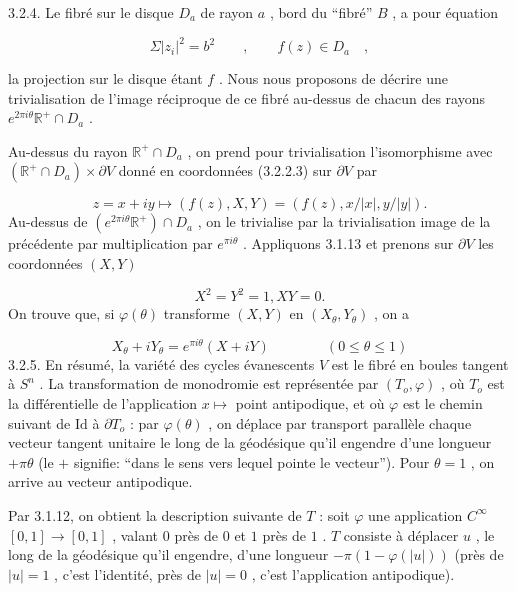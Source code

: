 3.2.4. Le fibré sur le disque $D_a$ de rayon $a$ , bord du ``fibré'' $B$ , a pour équation

\begin{equation*}
\Sigma |z_i|^2 = b^2 \qquad , \qquad f(z) \in D_a \quad , 
\end{equation*}


 la projection sur le disque étant $f$ . Nous nous proposons de décrire une trivialisation de l'image réciproque de ce fibré au-dessus de chacun des rayons $e^{2\pi i \theta} \mathbb{R}^+ \cap D_a$ .

Au-dessus du rayon $\mathbb{R}^+ \cap D_a$ , on prend pour trivialisation l'isomorphisme avec $(\mathbb{R}^+ \cap D_a) \times \partial V$ donné en coordonnées (3.2.2.3) sur $\partial V$ par

\begin{equation*}
z = x+iy \longmapsto (f(z), X, Y) = (f(z), x/|x|, y/|y|) .
\end{equation*}
Au-dessus de $(e^{2\pi i \theta} \mathbb{R}^+) \cap D_a$ , on le trivialise par la trivialisation image de la précédente par multiplication par $e^{\pi i \theta}$ . Appliquons 3.1.13 et prenons sur $\partial V$ les coordonnées $(X, Y)$

\begin{equation}\tag{3.2.4.1}
X^2 = Y^2 = 1, XY = 0 .
\end{equation}
On trouve que, si $\varphi(\theta)$ transforme $(X, Y)$ en $(X_\theta, Y_\theta)$ , on a

\begin{equation}\tag{3.2.4.2}
X_\theta + i Y_\theta = e^{\pi i \theta}(X + i Y) \qquad\qquad (0 \leq \theta \leq 1)
\end{equation}
3.2.5. En résumé, la variété des cycles évanescents $V$ est le fibré en boules tangent à $S^n$ . La transformation de monodromie est représentée par $(T_o, \varphi)$ , où $T_o$ est la différentielle de l'application $x \longmapsto$ point antipodique, et où $\varphi$ est le chemin suivant de $\mathrm{Id}$ à $\partial T_o$ : par $\varphi(\theta)$ , on déplace par transport parallèle chaque vecteur tangent unitaire le long de la géodésique qu'il engendre d'une longueur $+ \pi \theta$ (le $+$ signifie: ``dans le sens vers lequel pointe le vecteur''). Pour $\theta = 1$ , on arrive au vecteur antipodique.

Par 3.1.12, on obtient la description suivante de $T$ : soit $\varphi$ une application $C^\infty$ $[0,1] \to [0,1]$ , valant $0$ près de $0$ et $1$ près de $1$ . $T$ consiste à déplacer $u$ , le long de la géodésique qu'il engendre, d'une longueur $- \pi(1-\varphi(|u|))$ (près de $|u| = 1$ , c'est l'identité, près de $|u| = 0$ , c'est l'application antipodique).


